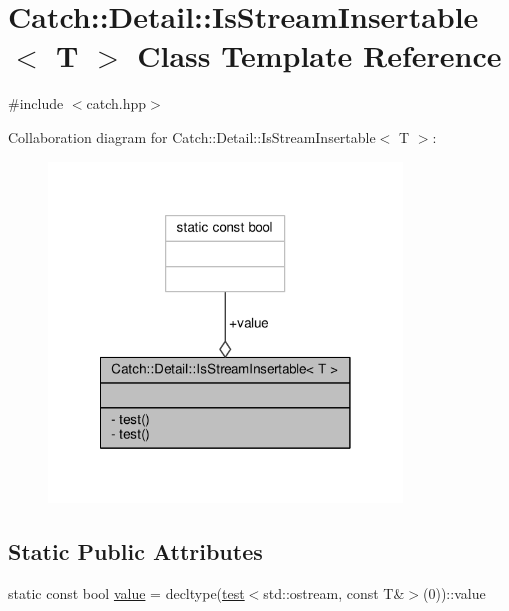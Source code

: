 \hypertarget{class_catch_1_1_detail_1_1_is_stream_insertable}{\section{Catch\-:\-:Detail\-:\-:Is\-Stream\-Insertable$<$ T $>$ Class Template Reference}
\label{class_catch_1_1_detail_1_1_is_stream_insertable}
}


{\ttfamily \#include $<$catch.\-hpp$>$}



Collaboration diagram for Catch\-:\-:Detail\-:\-:Is\-Stream\-Insertable$<$ T $>$\-:
\nopagebreak
\begin{figure}[H]
\begin{center}
\leavevmode
\includegraphics[width=266pt]{class_catch_1_1_detail_1_1_is_stream_insertable__coll__graph}
\end{center}
\end{figure}
\subsection*{Static Public Attributes}
\begin{DoxyCompactItemize}
\item 
static const bool \hyperlink{class_catch_1_1_detail_1_1_is_stream_insertable_a42818b09ae5851126a70ee263769e309}{value} = decltype(\hyperlink{class_catch_1_1_detail_1_1_is_stream_insertable_ac5981238a76d66e36b3d014aa870d15c}{test}$<$std\-::ostream, const T\&$>$(0))\-::value
\end{DoxyCompactItemize}
